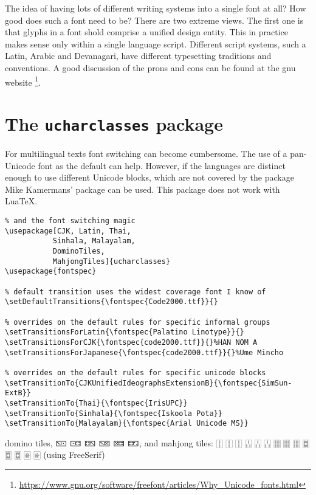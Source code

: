 The idea of having lots of different writing systems into a single font at all? How good does such a font need to be?
There are two extreme views.  The first one is that glyphs in a font shold comprise a unified design entity. This in practice makes sense only within a single language script. Different script systems, such a Latin, Arabic and Devanagari, have different typesetting traditions and conventions.  A good discussion of the prons and cons can be found at the gnu website \footnote{\protect\url{https://www.gnu.org/software/freefont/articles/Why_Unicode_fonts.html}}.

\section{The \texttt{ucharclasses} package}

For multilingual texts font switching can become cumbersome. The use of a pan-Unicode font as the default can help. However, if the languages are distinct enough to use different Unicode blocks, which are not covered by the  package Mike Kamermans' package  can be used. This package does not work with LuaTeX. 

\begin{verbatim}
% and the font switching magic
\usepackage[CJK, Latin, Thai, 
           Sinhala, Malayalam, 
           DominoTiles, 
           MahjongTiles]{ucharclasses}
\usepackage{fontspec}

% default transition uses the widest coverage font I know of
\setDefaultTransitions{\fontspec{Code2000.ttf}}{}

% overrides on the default rules for specific informal groups
\setTransitionsForLatin{\fontspec{Palatino Linotype}}{}
\setTransitionsForCJK{\fontspec{code2000.ttf}}{}%HAN NOM A
\setTransitionsForJapanese{\fontspec{code2000.ttf}}{}%Ume Mincho

% overrides on the default rules for specific unicode blocks
\setTransitionTo{CJKUnifiedIdeographsExtensionB}{\fontspec{SimSun-ExtB}}
\setTransitionTo{Thai}{\fontspec{IrisUPC}}
\setTransitionTo{Sinhala}{\fontspec{Iskoola Pota}}
\setTransitionTo{Malayalam}{\fontspec{Arial Unicode MS}}

\end{verbatim}

{
\newfontfamily{}
domino tiles, 🁇 🀼 🁐 🁋 🁚 🁝, and mahjong tiles: 🀑 🀑 🀑 🀒 🀒 🀒 🀕 🀕 🀕 🀗 🀗 🀗 🀅 🀅 (using FreeSerif)

}

